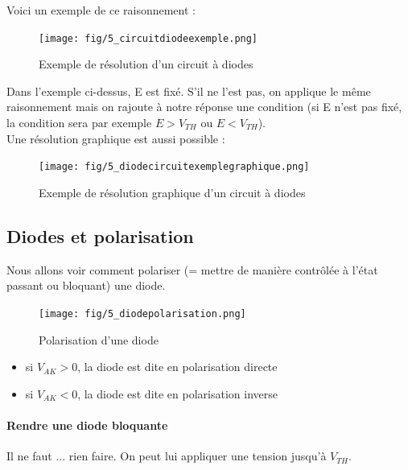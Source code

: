 \documentclass[a4paper]{article}
\begin{document}
    Voici un exemple de ce raisonnement :
    \begin{figure}[H]
        \begin{center}
            \texttt{[image: fig/5\_circuitdiodeexemple.png]}
            \caption{Exemple de résolution d'un circuit à diodes}
            \label{fig:5_circuitdiodeexemple}
        \end{center}
    \end{figure}

    Dans l'exemple ci-dessus, E est fixé. S'il ne l'est pas, on applique le 
    même raisonnement mais on rajoute à notre réponse une condition (si E
    n'est pas fixé, la condition sera par exemple $E > V_{TH}$ ou $E < V_{TH}$).\\

    Une résolution graphique est aussi possible :
    \begin{figure}[H]
        \begin{center}
            \texttt{[image: fig/5\_diodecircuitexemplegraphique.png]}
            \caption{Exemple de résolution graphique d'un circuit à diodes}
            \label{fig:5_diodecircuitexemplegraphique}
        \end{center}
    \end{figure}

    \subsection{Diodes et polarisation}
    Nous allons voir comment polariser (= mettre de manière contrôlée à l'état passant ou bloquant) une diode.

    \begin{figure}[H]
        \begin{center}
            \texttt{[image: fig/5\_diodepolarisation.png]}
            \caption{Polarisation d'une diode}
            \label{fig:5_diodepolarisation}
        \end{center}
    \end{figure}
    \begin{itemize}
        \item si $V_{AK} > 0$, la diode est dite en polarisation directe
        \item si $V_{AK} < 0$, la diode est dite en polarisation inverse
    \end{itemize}

    \paragraph{Rendre une diode bloquante}
    Il ne faut ... rien faire. On peut lui appliquer une tension jusqu'à $V_{TH}$.
\end{document}
